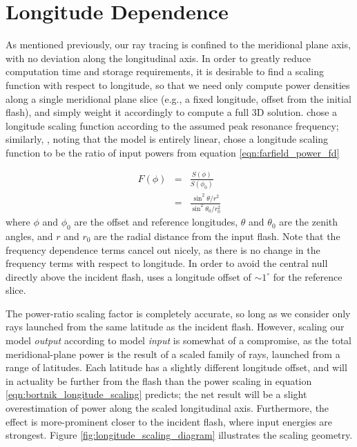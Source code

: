 \section{Longitude Dependence}
\label{section:longitude_scaling}
As mentioned previously, our ray tracing is confined to the meridional plane axis, with no deviation along the longitudinal axis. In order to greatly reduce computation time and storage requirements, it is desirable to find a scaling function with respect to longitude, so that we need only compute power densities along a single meridional plane slice (e.g., a fixed longitude, offset from the initial flash), and simply weight it accordingly to compute a full 3D solution. \citeauthor{Lauben1998} chose a longitude scaling function according to the assumed peak resonance frequency; similarly, \citeauthor{Bortnik2005}, noting that the model is entirely linear, chose a longitude scaling function to be the ratio of input powers from equation \eqref{eqn:farfield_power_fd}

\begin{eqnarray}
F(\phi) & = & \frac{S(\phi)}{S(\phi_0)} \\
& = & \frac{\sin^2\theta/r^2}{\sin^2\theta_0/r_0^2}
\label{eqn:bortnik_longitude_scaling}
\end{eqnarray}
\noindent where $\phi$ and $\phi_0$ are the offset and reference longitudes, $\theta$ and $\theta_0$ are the zenith angles, and $r$ and $r_0$ are the radial distance from the input flash. Note that the frequency dependence terms cancel out nicely, as there is no change in the frequency terms with respect to longitude. In order to avoid the central null directly above the incident flash, \citeauthor{Bortnik2005} uses a longitude offset of $\sim 1^\circ$ for the reference slice.

The power-ratio scaling factor is completely accurate, so long as we consider only rays launched from the same latitude as the incident flash. However, scaling our model \emph{output} according to model \emph{input} is somewhat of a compromise, as the total meridional-plane power is the result of a scaled family of rays, launched from a range of latitudes. Each latitude has a slightly different longitude offset, and will in actuality be further from the flash than the power scaling in equation \eqref{eqn:bortnik_longitude_scaling} predicts; the net result will be a slight overestimation of power along the scaled longitudinal axis. Furthermore, the effect is more-prominent closer to the incident flash, where input energies are strongest. Figure \ref{fig:longitude_scaling_diagram} illustrates the scaling geometry.

